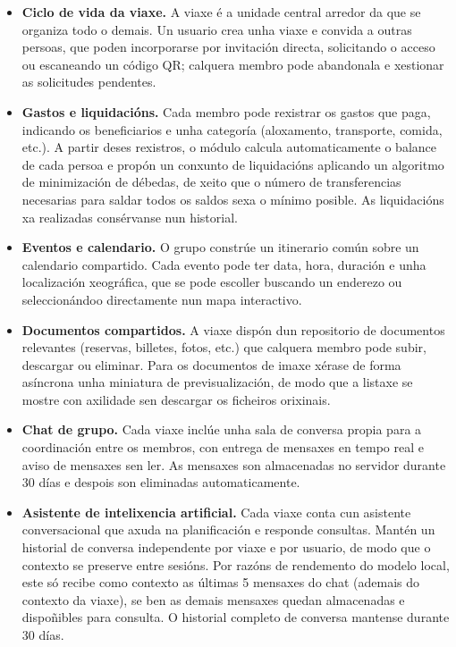 \begin{itemize}
  \item \textbf{Ciclo de vida da viaxe.} A viaxe é a unidade central arredor da que se organiza
        todo o demais. Un usuario crea unha viaxe e convida a outras persoas, que poden
        incorporarse por invitación directa, solicitando o acceso ou escaneando un código QR;
        calquera membro pode abandonala e xestionar as solicitudes pendentes.

  \item \textbf{Gastos e liquidacións.} Cada membro pode rexistrar os gastos que paga, indicando
        os beneficiarios e unha categoría (aloxamento, transporte, comida, etc.). A partir deses
        rexistros, o módulo calcula automaticamente o balance de cada persoa e propón un conxunto
        de liquidacións aplicando un algoritmo de minimización de débedas, de xeito que o número
        de transferencias necesarias para saldar todos os saldos sexa o mínimo posible. As
        liquidacións xa realizadas consérvanse nun historial.

  \item \textbf{Eventos e calendario.} O grupo constrúe un itinerario común sobre un calendario
        compartido. Cada evento pode ter data, hora, duración e unha localización xeográfica,
        que se pode escoller buscando un enderezo ou seleccionándoo directamente nun mapa
        interactivo.

  \item \textbf{Documentos compartidos.} A viaxe dispón dun repositorio de documentos relevantes
        (reservas, billetes, fotos, etc.) que calquera membro pode subir, descargar ou eliminar.
        Para os documentos de imaxe xérase de forma asíncrona unha miniatura de previsualización,
        de modo que a listaxe se mostre con axilidade sen descargar os ficheiros orixinais.

  \item \textbf{Chat de grupo.} Cada viaxe inclúe unha sala de conversa propia para a
        coordinación entre os membros, con entrega de mensaxes en tempo real e aviso de mensaxes
        sen ler. As mensaxes son almacenadas no servidor durante 30 días
        e despois son eliminadas automaticamente.

  \item \textbf{Asistente de intelixencia artificial.} Cada viaxe conta cun asistente
        conversacional que axuda na planificación e responde consultas. Mantén un historial de
        conversa independente por viaxe e por usuario, de modo que o contexto se preserve entre sesións.
        Por razóns de rendemento do modelo local, este só recibe como contexto as últimas 5 mensaxes do
        chat (ademais do contexto da viaxe),
        se ben as demais mensaxes quedan almacenadas e dispoñibles para consulta. O historial completo de conversa mantense durante 30 días.


\end{itemize}
